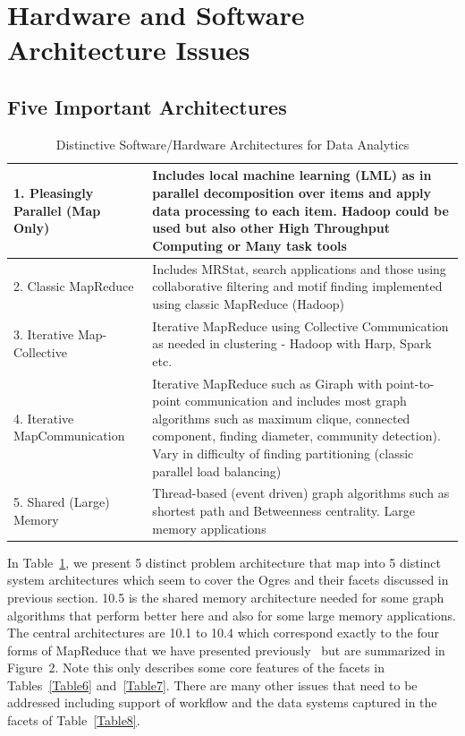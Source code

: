\documentclass{acm_proc_article-sp}
\begin{document}
\section{Hardware and Software Architecture Issues}
\subsection{Five Important Architectures}

\begin{table}[h]
\centering
\caption{Distinctive Software/Hardware Architectures for Data Analytics}
\label{Table10}
\begin{tabular}{|p{2.55cm}|p{5.45cm}|} \hline
1. Pleasingly Parallel (Map Only) & Includes local machine learning (LML) as in parallel decomposition over items and apply data processing to each item. Hadoop could be used but also other High Throughput Computing or Many task tools \\ \hline
2. Classic Map\-Reduce & Includes MRStat, search applications and those using collaborative filtering and motif finding implemented using classic MapReduce (Hadoop)\\ \hline
3. Iterative Map-Collective & Iterative MapReduce using Collective Communication as needed in clustering - Hadoop with Harp, Spark etc. \\ \hline
4. Iterative Map\-Communi\-cation & Iterative MapReduce such as Giraph with point-to-point communication and includes most graph algorithms such as maximum clique,  connected component, finding diameter, community detection). Vary in difficulty of finding partitioning (classic parallel load balancing)\\ \hline
5. Shared (Lar\-ge) Memory & Thread-based (event driven) graph algorithms such as shortest path and Betweenness centrality. Large memory applications
 
\\ \hline
\end{tabular}
\end{table}

In Table~\ref{Table10}, we present 5 distinct problem architecture that map into 5 distinct system architectures which seem to cover the Ogres and their facets discussed in previous section. 10.5 is the shared memory architecture needed for some graph algorithms that perform better here and also for some large memory applications. The central architectures are 10.1 to 10.4 which correspond exactly to the four forms of MapReduce that we have presented previously~\cite{b18} but are summarized in Figure~2. Note this only describes some core features of the facets in Tables~\ref{Table6} and~\ref{Table7}. There are many other issues that need to be addressed including support of workflow and the data systems captured in the facets of Table~\ref{Table8}.
\end{document}
